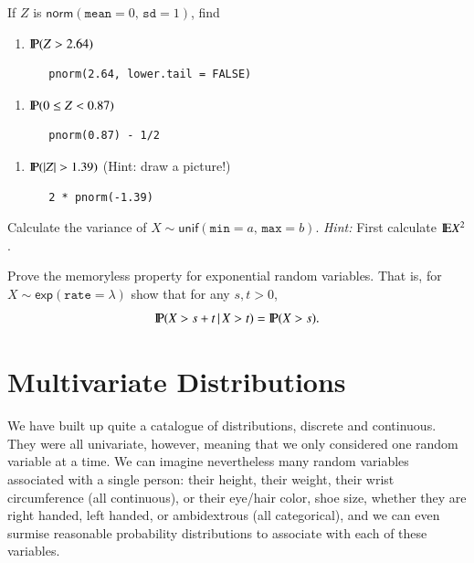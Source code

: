 \documentclass[captions=tableheading]{scrbook}
\begin{document}
\begin{xca}
If \(Z\) is \(\mathsf{norm}(\mathtt{mean}=0,\,\mathtt{sd}=1)\), find 
\begin{enumerate}
\item \(\P(Z>2.64)\)

\begin{verbatim}
   pnorm(2.64, lower.tail = FALSE)
\end{verbatim}
\end{enumerate}

\begin{enumerate}
\item \(\P(0\leq Z<0.87)\)

\begin{verbatim}
   pnorm(0.87) - 1/2
\end{verbatim}
\end{enumerate}

\begin{enumerate}
\item \(\P(|Z|>1.39)\) (Hint: draw a picture!)

\begin{verbatim}
   2 * pnorm(-1.39)
\end{verbatim}
\end{enumerate}

\end{xca}

\begin{xca}
\label{xca:variance-dunif}
Calculate the variance of \(X\sim\mathsf{unif}(\mathtt{min}=a,\,\mathtt{max}=b)\). \emph{Hint:} First calculate \(\E X^{2}\).
\end{xca}

\begin{xca}
\label{xca:prove-the-memoryless}
Prove the memoryless property for exponential random variables. That is, for \(X\sim\mathsf{exp}(\mathtt{rate}=\lambda)\) show that for any \(s,t>0\),
\[
\P(X>s+t\,|\, X>t)=\P(X>s).
\]
\end{xca}
\chapter{Multivariate Distributions}
\label{sec-7}

\label{cha:Multivariable-Distributions}

\noindent We have built up quite a catalogue of distributions, discrete and continuous. They were all univariate, however, meaning that we only considered one random variable at a time. We can imagine nevertheless many random variables associated with a single person: their height, their weight, their wrist circumference (all continuous), or their eye/hair color, shoe size, whether they are right handed, left handed, or ambidextrous (all categorical), and we can even surmise reasonable probability distributions to associate with each of these variables.
\end{document}
